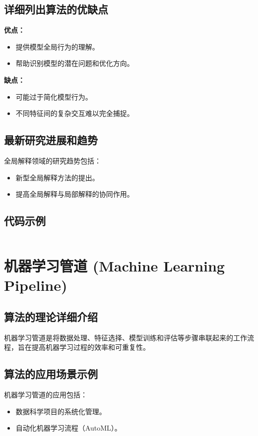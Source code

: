 \subsection*{详细列出算法的优缺点}
\textbf{优点：}
\begin{itemize}
    \item 提供模型全局行为的理解。
    \item 帮助识别模型的潜在问题和优化方向。
\end{itemize}

\textbf{缺点：}
\begin{itemize}
    \item 可能过于简化模型行为。
    \item 不同特征间的复杂交互难以完全捕捉。
\end{itemize}

\subsection*{最新研究进展和趋势}
全局解释领域的研究趋势包括：
\begin{itemize}
    \item 新型全局解释方法的提出。
    \item 提高全局解释与局部解释的协同作用。
\end{itemize}
\subsection*{代码示例}
\begin{lstlisting}

\end{lstlisting}


\section{机器学习管道 (Machine Learning Pipeline)}
\subsection*{算法的理论详细介绍}
机器学习管道是将数据处理、特征选择、模型训练和评估等步骤串联起来的工作流程，旨在提高机器学习过程的效率和可重复性。

\subsection*{算法的应用场景示例}
机器学习管道的应用包括：
\begin{itemize}
    \item 数据科学项目的系统化管理。
    \item 自动化机器学习流程（AutoML）。
\end{itemize}

